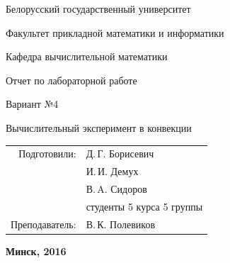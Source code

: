 \documentclass[a4paper, 12pt]{article}
\begin{document}
  \begin{titlepage}
    \begin{center} %
      \bfseries

      {\Large Белорусский государственный университет}

      \vspace{96pt}

      {\large Факультет прикладной математики и информатики}

      \vspace{72pt}

      {\large Кафедра вычислительной математики}

      \vspace{96pt}

      Отчет по лабораторной работе

      \vspace{24pt}

      Вариант №4

      \vspace{24pt}

      {\Large Вычислительный эксперимент в конвекции}

    \end{center}

    \vspace{120pt}

    \begin{flushright}
      \begin{tabular}{rl}
        Подготовили: & Д.\,Г. Борисевич \\
                     & И.\,И. Демух \\
                     & В.\,A. Сидоров \\
                     &студенты 5 курса 5 группы\\
        Преподаватель: & В.\,К. Полевиков \\
      \end{tabular}
    \end{flushright}

    \vfill

    \begin{center}
      \bfseries
      Минск, 2016
    \end{center}
  \end{titlepage}
\end{document}
